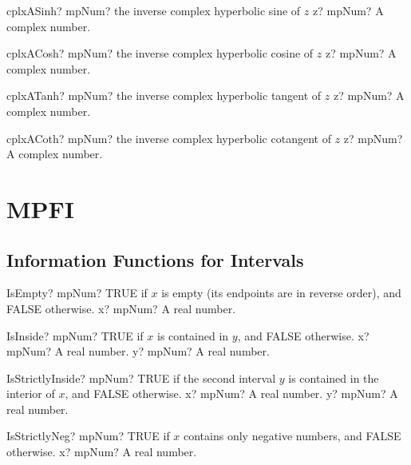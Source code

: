\documentclass[12pt,a4paper,openany]{book}
\begin{document}
\begin{mpFunctionsExtract}
\mpFunctionOne
{cplxASinh? mpNum? the inverse complex hyperbolic sine of $z$}
{z? mpNum? A complex number.}
\end{mpFunctionsExtract}

\begin{mpFunctionsExtract}
\mpFunctionOne
{cplxACosh? mpNum? the inverse complex hyperbolic cosine of $z$}
{z? mpNum? A complex number.}
\end{mpFunctionsExtract}

\begin{mpFunctionsExtract}
\mpFunctionOne
{cplxATanh? mpNum? the inverse complex hyperbolic tangent of $z$}
{z? mpNum? A complex number.}
\end{mpFunctionsExtract}

\begin{mpFunctionsExtract}
\mpFunctionOne
{cplxACoth? mpNum? the inverse complex hyperbolic cotangent of $z$}
{z? mpNum? A complex number.}
\end{mpFunctionsExtract}

\chapter{MPFI}

\section{Information Functions for Intervals}

\begin{mpFunctionsExtract}
\mpFunctionOne
{IsEmpty? mpNum? TRUE  if $x$ is empty (its endpoints are in reverse order), and FALSE otherwise.}
{x? mpNum? A real number.}
\end{mpFunctionsExtract}

\begin{mpFunctionsExtract}
\mpFunctionTwo
{IsInside? mpNum? TRUE  if $x$ is contained in $y$, and FALSE otherwise.}
{x? mpNum? A real number.}
{y? mpNum? A real number.}
\end{mpFunctionsExtract}

\begin{mpFunctionsExtract}
\mpFunctionTwo
{IsStrictlyInside? mpNum? TRUE  if the second interval $y$ is contained in the interior of $x$, and FALSE otherwise.}
{x? mpNum? A real number.}
{y? mpNum? A real number.}
\end{mpFunctionsExtract}

\begin{mpFunctionsExtract}
\mpFunctionOne
{IsStrictlyNeg? mpNum? TRUE if $x$ contains only negative numbers, and FALSE otherwise.}
{x? mpNum? A real number.}
\end{mpFunctionsExtract}
\end{document}
